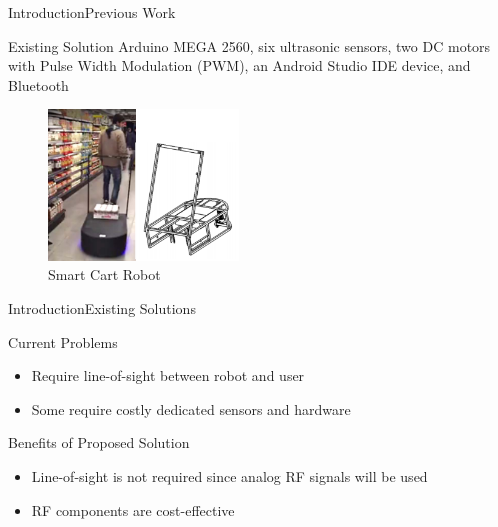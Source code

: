 \documentclass{beamer}
\begin{document}

\begin{frame}{Introduction}{Previous Work}
  \begin{block}{Existing Solution}
    Arduino MEGA 2560, six ultrasonic sensors, two DC motors with Pulse Width Modulation (PWM), an Android Studio IDE device, and Bluetooth~\cite{Rawashdeh2017-Person}
  \end{block}
    \begin{figure}[b]
        \centering
        \includegraphics[width=0.45\textwidth]{figs/img/SmartCart}
        \caption{Smart Cart Robot}
    \end{figure}
\end{frame}


\begin{frame}{Introduction}{Existing Solutions}
  \begin{block}{Current Problems}
    \begin{itemize}
      \item Require line-of-sight between robot and user
      \item Some require costly dedicated sensors and hardware
    \end{itemize}
  \end{block}
  \pause
  \begin{block}{Benefits of Proposed Solution}
    \begin{itemize}
      \item Line-of-sight is not required since analog RF signals will be used
      \item RF components are cost-effective
    \end{itemize}
  \end{block}
\end{frame}

\end{document}
